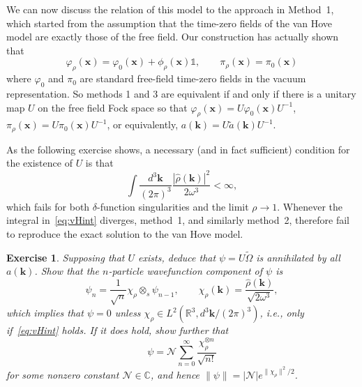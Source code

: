 \documentclass[12pt]{article}
\newcommand{\1}{\mathds{1}}                         %
\newcommand{\RR}{\mathbb{R}}           %
\newcommand{\CC}{\mathbb{C}}           %
\newcommand{\kb}{{\boldsymbol{k}}}
\newcommand{\xb}{{\boldsymbol{x}}}
\newtheorem{exercise}[theorem]{Exercise}
\begin{document}
	We can now discuss the relation of this model to the approach in Method~1,
	which started from the assumption that the time-zero fields of the van Hove model are exactly those of the free field. Our construction has actually shown that
	\begin{equation}
	\varphi_\rho(\xb) = \varphi_0(\xb) + \phi_\rho(\xb)\mathbb{1}, \qquad\pi_\rho(\xb) =
	\pi_0(\xb) 
	\end{equation}
	where $\varphi_0$ and $\pi_0$ are standard free-field time-zero fields in the vacuum representation. So methods 1 and 3 are equivalent if and only if there is a unitary
	map $U$ on the free field Fock space so that $\varphi_\rho(\xb)=U\varphi_0(\xb)U^{-1}$, $\pi_\rho(\xb)=U\pi_0(\xb)U^{-1}$, 
	or equivalently, $a(\kb)  = U \tilde{a}(\kb) U^{-1}$.
	
	As the following exercise shows, a necessary (and in fact sufficient) condition for the existence of $U$ is that 
	\begin{equation}\label{eq:vHint}
	\int \frac{d^3\kb}{(2\pi)^3} \frac{|\hat{\rho}(\kb)|^2}{2\omega^3} <\infty,
	\end{equation}
	which fails for both $\delta$-function singularities and the limit $\rho\to 1$.  Whenever the integral in~\eqref{eq:vHint} diverges, method~1, and similarly method~2, therefore fail to reproduce the exact solution to the van Hove model.
	
	\begin{exercise}
		Supposing that $U$ exists, deduce that $\psi = U\tilde{\Omega}$ is annihilated by all $a(\kb)$. Show that the $n$-particle wavefunction component of $\psi$ is
		\[
		\psi_n = \frac{1}{\sqrt{n}}\chi_\rho\otimes_s \psi_{n-1},\qquad \chi_\rho(\kb)= \frac{\hat{\rho}(\kb)}{\sqrt{2\omega^3}},
		\]
		which implies that $\psi=0$ unless $\chi_\rho\in L^2(\RR^3,d^3\kb/(2\pi)^3)$, i.e., only if~\eqref{eq:vHint} holds. If it does hold, show further that
		\[
		\psi = \mathcal{N} \sum_{n=0}^\infty \frac{\chi_\rho^{\otimes n}}{\sqrt{n!}}
		\]
		for some nonzero constant $\mathcal{N}\in\CC$,
		and hence $\|\psi\| = |\mathcal{N}| e^{\|\chi_\rho\|^2/2}$. 
	\end{exercise}
	
\end{document}
